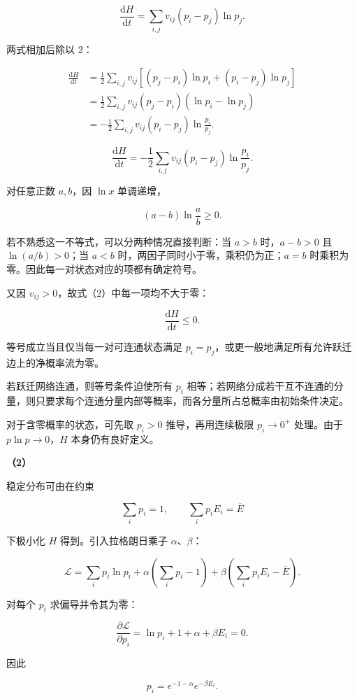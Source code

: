 \documentclass[12pt,a4paper,UTF8]{ctexart}
\begin{document}
\[\frac{\mathrm dH}{\mathrm dt}
=\sum_{i,j}v_{ij}(p_i-p_j)\ln p_j.\]

两式相加后除以 \(2\)：

\[\begin{aligned}
\frac{\mathrm dH}{\mathrm dt}
&=\frac12\sum_{i,j}v_{ij}
\left[(p_j-p_i)\ln p_i+(p_i-p_j)\ln p_j\right]\\
&=\frac12\sum_{i,j}v_{ij}(p_j-p_i)
\left(\ln p_i-\ln p_j\right)\\
&=-\frac12\sum_{i,j}v_{ij}(p_i-p_j)
\ln\frac{p_i}{p_j}.
\end{aligned}\]

\[\boxed{
\frac{\mathrm dH}{\mathrm dt}
=-\frac12\sum_{i,j}v_{ij}(p_i-p_j)
\ln\frac{p_i}{p_j}
}. \tag{2}\]

对任意正数 \(a,b\)，因 \(\ln x\) 单调递增，

\[(a-b)\ln\frac ab\geq0.\]

若不熟悉这一不等式，可以分两种情况直接判断：当 \(a>b\) 时，\(a-b>0\) 且
\(\ln(a/b)>0\)；当 \(a<b\) 时，两因子同时小于零，乘积仍为正；\(a=b\)
时乘积为零。因此每一对状态对应的项都有确定符号。

又因 \(v_{ij}>0\)，故式（2）中每一项均不大于零：

\[\boxed{\frac{\mathrm dH}{\mathrm dt}\leq0}.\]

等号成立当且仅当每一对可连通状态满足
\(p_i=p_j\)，或更一般地满足所有允许跃迁边上的净概率流为零。

若跃迁网络连通，则等号条件迫使所有 \(p_i\)
相等；若网络分成若干互不连通的分量，则只要求每个连通分量内部等概率，而各分量所占总概率由初始条件决定。

对于含零概率的状态，可先取 \(p_i>0\) 推导，再用连续极限 \(p_i\to0^+\)
处理。由于 \(p\ln p\to0\)，\(H\) 本身仍有良好定义。

\textbf{（2）}

稳定分布可由在约束

\[\sum_i p_i=1,\qquad \sum_i p_iE_i=\overline E\]

下极小化 \(H\) 得到。引入拉格朗日乘子 \(\alpha\)、\(\beta\)：

\[\mathcal L=\sum_i p_i\ln p_i
+\alpha\left(\sum_i p_i-1\right)
+\beta\left(\sum_i p_iE_i-\overline E\right).\]

对每个 \(p_i\) 求偏导并令其为零：

\[\frac{\partial\mathcal L}{\partial p_i}
=\ln p_i+1+\alpha+\beta E_i=0.\]

因此

\[p_i=e^{-1-\alpha}e^{-\beta E_i}.\]
\end{document}
